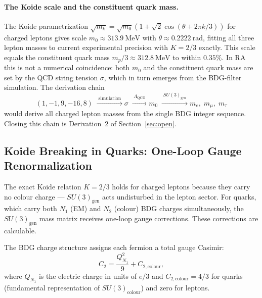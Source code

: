 \documentclass[11pt,a4paper]{article}
\begin{document}
\paragraph{The Koide scale and the constituent quark mass.}
The Koide parametrization $\sqrt{m_k} = \sqrt{m_0}(1 + \sqrt{2}\cos(\theta +
2\pi k/3))$ for charged leptons gives scale $m_0 \approx 313.9~\mathrm{MeV}$
with $\theta \approx 0.2222~\mathrm{rad}$, fitting all three lepton masses
to current experimental precision with $K = 2/3$ exactly.
This scale equals the constituent quark mass $m_p/3 \approx 312.8~\mathrm{MeV}$
to within $0.35\%$. In RA this is not a numerical coincidence: both $m_0$
and the constituent quark mass are set by the QCD string tension $\sigma$,
which in turn emerges from the BDG-filter simulation. The derivation chain
\begin{equation}
  (1,{-1},9,{-16},8)
  \;\xrightarrow{\;\mathrm{simulation}\;}
  \sigma
  \;\xrightarrow{\;\Lambda_{\mathrm{QCD}}\;}
  m_0
  \;\xrightarrow{\;SU(3)_{\mathrm{gen}}\;}
  m_e,\;m_\mu,\;m_\tau
  \label{eq:mass_chain}
\end{equation}
would derive all charged lepton masses from the single BDG integer sequence.
Closing this chain is Derivation~2 of Section~\ref{sec:open}.

\subsection{Koide Breaking in Quarks: One-Loop Gauge Renormalization}
\label{sec:koide_breaking}

The exact Koide relation $K = 2/3$ holds for charged leptons because they
carry no colour charge --- $SU(3)_{\mathrm{gen}}$ acts undisturbed in the
lepton sector. For quarks, which carry both $N_1$ (EM) and $N_2$ (colour)
BDG charges simultaneously, the $SU(3)_{\mathrm{gen}}$ mass matrix receives
one-loop gauge corrections. These corrections are calculable.

The BDG charge structure assigns each fermion a total gauge Casimir:
\begin{equation}
  C_2 = \frac{Q_{N_1}^2}{9} + C_{2,\mathrm{colour}},
  \label{eq:C2_total}
\end{equation}
where $Q_{N_1}$ is the electric charge in units of $e/3$ and
$C_{2,\mathrm{colour}} = 4/3$ for quarks (fundamental representation of
$SU(3)_{\mathrm{colour}}$) and zero for leptons.
\end{document}
